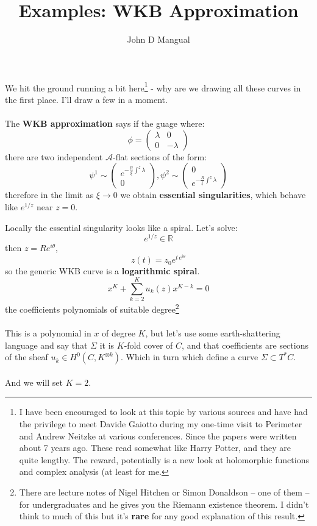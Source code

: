 \documentclass[12pt]{article}
\title{\textbf{ Examples:  WKB Approximation }}
\author{John D Mangual}
\date{}
\begin{document}
\selectfont \fontsize{25}{30}\selectfont

\maketitle

\noindent We hit the ground running a bit here\footnote{I have been encouraged to look at this topic by various sources and have had the privilege to meet Davide Gaiotto during my one-time visit to Perimeter and Andrew Neitzke at various conferences.  Since the papers were written about 7 years ago.  These read somewhat like Harry Potter, and they are quite lengthy.  The reward, potentially is a new look at holomorphic functions and complex analysis (at least for me.} - why are we drawing all these curves in the first place.  I'll draw a few in a moment.  \\ \\
The \textbf{WKB approximation} says if the guage where:
$$ \phi = \left( \begin{array}{cc} 
\lambda & 0 \\ 0 & -\lambda \end{array} \right) $$
there are two independent $\mathcal{A}$-flat sections of the form:
$$\psi^1 \sim \left( \begin{array}{c} 
e^{- \frac{R}{\xi} \int^z \lambda } \\ 0 \end{array} \right), 
\psi^2 \sim \left( \begin{array}{c} 0 \\ 
e^{- \frac{R}{\xi} \int^z \lambda }\end{array} \right) $$
therefore in the limit as $\xi \to 0$ we obtain \textbf{essential singularities}, which behave like $e^{1/z}$ near $z = 0$. 

\newpage

\noindent Locally the essential singularity looks like a spiral.  Let's solve:
$$ e^{1/z} \in \mathbb{R} $$
then $z = R e^{i\theta}$, 
$$ z(t) = z_0 e^{t\, e^{i\theta}} $$
so the generic WKB curve is a \textbf{logarithmic spiral}.
$$ x^K + \sum_{k=2}^K u_k(z) x^{K-k} = 0$$
the coefficients polynomials of suitable degree\footnote{There are lecture notes of Nigel Hitchen or Simon Donaldson -- one of them -- for undergraduates and he gives you the Riemann existence theorem.  I didn't think to much of this but it's \textbf{rare} for any good explanation of this result.} \\ \\
This is a polynomial in $x$ of degree $K$, but let's use some earth-shattering language and say that $\Sigma$ it is $K$-fold cover of $C$, and that coefficients are sections of the sheaf $u_k \in H^0(C, K^{\otimes k})$.  Which in turn which define a curve $\Sigma \subset T^\ast C$. \\ \\ 
And we will set $K = 2$.  \newpage
\end{document}
